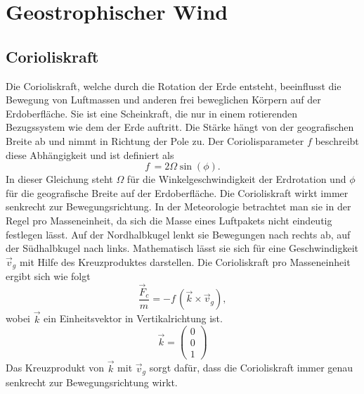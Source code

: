 %
%
%
%
\section{Geostrophischer Wind
\label{geostrophisch:section:geoWind}}


\subsection{Corioliskraft
\label{geostrophisch:subsection:coriolis}}
Die Corioliskraft, welche durch die Rotation der Erde entsteht, beeinflusst die Bewegung von Luftmassen und anderen frei beweglichen Körpern auf der Erdoberfläche. Sie ist eine Scheinkraft, die nur in einem rotierenden Bezugssystem wie dem der Erde auftritt. Die Stärke hängt von der geografischen Breite ab und nimmt in Richtung der Pole zu.
Der Coriolisparameter $f$ beschreibt diese Abhängigkeit und ist definiert als 
\begin{equation}
f\, 
= 
2\Omega\sin(\phi)
\label{geostrophisch:equation1}.
\end{equation}
In dieser Gleichung steht $\Omega$ für die Winkelgeschwindigkeit der Erdrotation und $\phi$ für die geografische Breite auf der Erdoberfläche.
Die Corioliskraft wirkt immer senkrecht zur Bewegungsrichtung. In der Meteorologie betrachtet man sie in der Regel pro Masseneinheit, da sich die Masse eines Luftpakets nicht eindeutig festlegen lässt. Auf der Nordhalbkugel lenkt sie Bewegungen nach rechts ab, auf der Südhalbkugel nach links. Mathematisch lässt sie sich für eine Geschwindigkeit $\vec{v}_g $ mit Hilfe des Kreuzproduktes darstellen. 
Die Corioliskraft pro Masseneinheit ergibt sich wie folgt
\begin{equation}
\frac{\vec{F}_c} {m}
= 
-f\, (\vec{k} \times \vec{v}_g) 
\label{geostrophisch:equation2},
\end{equation}
wobei $\vec{k}$ ein Einheitsvektor in Vertikalrichtung ist.
\begin{equation}
\vec{k} =
\left(
\begin{array}{c}
0 \\
0 \\
1
\end{array}
\right)
\label{geostrophisch:equation3}
\end{equation}
Das Kreuzprodukt von $\vec{k}$ mit  $\vec{v}_g $ sorgt dafür, dass die Corioliskraft immer genau senkrecht zur Bewegungsrichtung wirkt.
